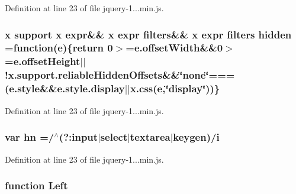 Definition at line 23 of file jquery-\/1...\+min.\+js.

\hypertarget{_scripts_2jquery-1_810_82_8min_8js_a086b6295ec8d15f090cd7239137a4979}{}
\subsubsection[{hidden}]{ {\bf x} support {\bf x} expr\&\& {\bf x} expr filters\&\& {\bf x} expr filters hidden =function({\bf e})\{return 0$>$=e.\+offset\+Width\&\&0$>$=e.\+offset\+Height$\vert$$\vert$!x.\+support.\+reliable\+Hidden\+Offsets\&\&\char`\"{}none\char`\"{}===(e.\+style\&\&e.\+style.\+display$\vert$$\vert$x.\+css({\bf e},\char`\"{}display\char`\"{}))\}}\label{_scripts_2jquery-1_810_82_8min_8js_a086b6295ec8d15f090cd7239137a4979}


Definition at line 23 of file jquery-\/1...\+min.\+js.

\hypertarget{_scripts_2jquery-1_810_82_8min_8js_a703d7f6a2aadb540eb051a5f62674194}{}
\subsubsection[{hn}]{\setlength{\rightskip}{0pt plus 5cm}var hn =/$^\wedge$(?\+:input$\vert$select$\vert$textarea$\vert$keygen)/{\bf i}}\label{_scripts_2jquery-1_810_82_8min_8js_a703d7f6a2aadb540eb051a5f62674194}


Definition at line 23 of file jquery-\/1...\+min.\+js.

\hypertarget{_scripts_2jquery-1_810_82_8min_8js_abef68bf244a1159a49fe3a2c153a65d2}{}
\subsubsection[{Left}]{\setlength{\rightskip}{0pt plus 5cm}function Left}\label{_scripts_2jquery-1_810_82_8min_8js_abef68bf244a1159a49fe3a2c153a65d2}


